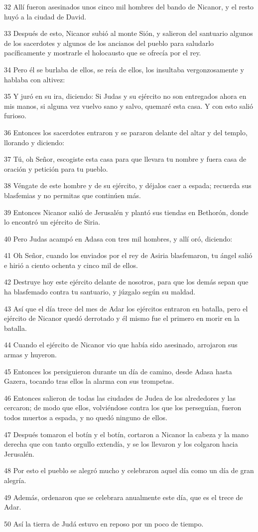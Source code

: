 \par 32 Allí fueron asesinados unos cinco mil hombres del bando de Nicanor, y el resto huyó a la ciudad de David.
\par 33 Después de esto, Nicanor subió al monte Sión, y salieron del santuario algunos de los sacerdotes y algunos de los ancianos del pueblo para saludarlo pacíficamente y mostrarle el holocausto que se ofrecía por el rey.
\par 34 Pero él se burlaba de ellos, se reía de ellos, los insultaba vergonzosamente y hablaba con altivez:
\par 35 Y juró en su ira, diciendo: Si Judas y su ejército no son entregados ahora en mis manos, si alguna vez vuelvo sano y salvo, quemaré esta casa. Y con esto salió furioso.
\par 36 Entonces los sacerdotes entraron y se pararon delante del altar y del templo, llorando y diciendo:
\par 37 Tú, oh Señor, escogiste esta casa para que llevara tu nombre y fuera casa de oración y petición para tu pueblo.
\par 38 Véngate de este hombre y de su ejército, y déjalos caer a espada; recuerda sus blasfemias y no permitas que continúen más.
\par 39 Entonces Nicanor salió de Jerusalén y plantó sus tiendas en Bethorón, donde lo encontró un ejército de Siria.
\par 40 Pero Judas acampó en Adasa con tres mil hombres, y allí oró, diciendo:
\par 41 Oh Señor, cuando los enviados por el rey de Asiria blasfemaron, tu ángel salió e hirió a ciento ochenta y cinco mil de ellos.
\par 42 Destruye hoy este ejército delante de nosotros, para que los demás sepan que ha blasfemado contra tu santuario, y júzgalo según su maldad.
\par 43 Así que el día trece del mes de Adar los ejércitos entraron en batalla, pero el ejército de Nicanor quedó derrotado y él mismo fue el primero en morir en la batalla.
\par 44 Cuando el ejército de Nicanor vio que había sido asesinado, arrojaron sus armas y huyeron.
\par 45 Entonces los persiguieron durante un día de camino, desde Adasa hasta Gazera, tocando tras ellos la alarma con sus trompetas.
\par 46 Entonces salieron de todas las ciudades de Judea de los alrededores y las cercaron; de modo que ellos, volviéndose contra los que los perseguían, fueron todos muertos a espada, y no quedó ninguno de ellos.
\par 47 Después tomaron el botín y el botín, cortaron a Nicanor la cabeza y la mano derecha que con tanto orgullo extendía, y se los llevaron y los colgaron hacia Jerusalén.
\par 48 Por esto el pueblo se alegró mucho y celebraron aquel día como un día de gran alegría.
\par 49 Además, ordenaron que se celebrara anualmente este día, que es el trece de Adar.
\par 50 Así la tierra de Judá estuvo en reposo por un poco de tiempo.

